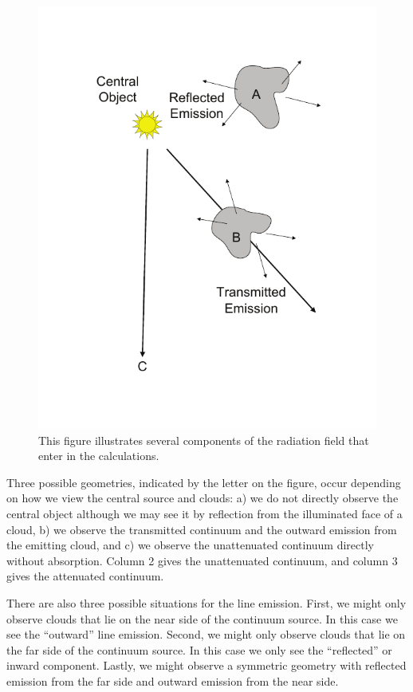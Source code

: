 \begin{figure}
\centering
\begin{centering}
\includegraphics[scale=0.9]{EmissionSaveComponents}
\caption[Radiation field components in save continuum]{
\label{fig:EmissionSaveComponents}
This figure illustrates several components of the radiation field that enter in
the calculations.}
\end{centering}
\end{figure}

Three possible geometries, indicated by the letter on the figure, occur
depending on how we view the central source and clouds: a) we do not directly
observe the central object although we may see it by reflection from the
illuminated face of a cloud, b) we observe the transmitted continuum and
the outward emission from the emitting cloud, and c) we observe the
unattenuated continuum directly without absorption.
Column 2 gives the
unattenuated continuum, and column 3 gives the attenuated continuum.

There are also three possible situations for the line emission.
First,
we might only observe clouds that lie on the near side of the continuum
source.
In this case we see the ``outward'' line emission.
Second, we
might only observe clouds that lie on the far side of the continuum source.
In this case we only see the ``reflected'' or inward component.
Lastly,
we might observe a symmetric geometry with reflected emission from the far
side and outward emission from the near side.


